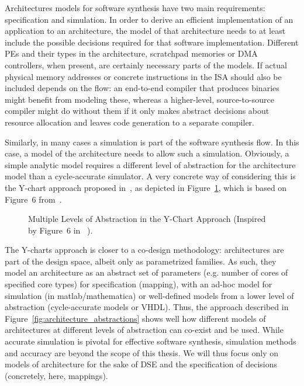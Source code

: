 Architectures models for software synthesis have two main requirements: specification and simulation.
In order to derive an efficient implementation of an application to an architecture, the model of that architecture needs to at least include the possible decisions required for that software implementation.
Different \acp{PE} and their types in the architecture, scratchpad memories or \ac{DMA} controllers, when present, are certainly necessary parts of the models.
If actual physical memory addresses or concrete instructions in the \ac{ISA} should also be included depends on the flow: an end-to-end compiler that produces binaries might benefit from modeling these,
whereas a higher-level, source-to-source compiler might do without them if it only makes abstract decisions about resource allocation and leaves code generation to a separate compiler.


Similarly, in many cases a simulation is part of the software synthesis flow.
In this case, a model of the architecture needs to allow such a simulation.
Obviously, a simple analytic model requires a different level of abstraction for the architecture model than a cycle-accurate simulator.
A very concrete way of considering this is the Y-chart approach proposed in~\cite{kienhuis2001methodology}, as depicted in Figure~\ref{fig:y_chart_abstractions}, which is based on Figure~6 from~\cite{kienhuis2001methodology}. 

\begin{figure}[h]
	\centering
\resizebox{0.95\textwidth}{!}{
   \begin{tikzpicture}
     
   \end{tikzpicture}
 }
   \caption{Multiple Levels of Abstraction in the Y-Chart Approach (Inspired by Figure~6 in ~\cite{kienhuis2001methodology}).}
   \label{fig:y_chart_abstractions}
\end{figure}

The Y-charts approach is closer to a co-design methodology: architectures are part of the design space, albeit only as parametrized families.
As such, they model an architecture as an abstract set of parameters (e.g. number of cores of specified core types) for specification (mapping), with an ad-hoc model for simulation (in matlab/mathematica) or well-defined models from a lower level of abstraction (cycle-accurate models or VHDL).
Thus, the approach described in Figure~\ref{fig:architecture_abstractions} shows well how different models of architectures at different levels of abstraction can co-exist and be used.
While accurate simulation is pivotal for effective software synthesis, simulation methods and accuracy are beyond the scope of this thesis.
We will thus focus only on models of architecture for the sake of \ac{DSE} and the specification of decisions (concretely, here, mappings).

